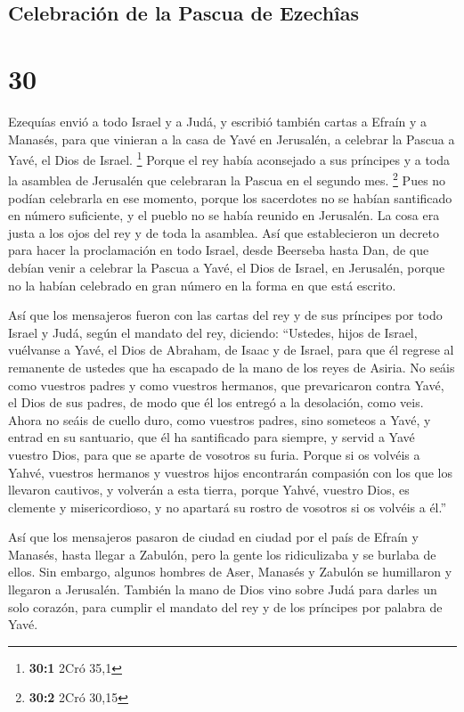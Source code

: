 \begin{paracol}{2}
{\subsection{Celebración de la Pascua de
Ezechîas}\label{celebraciuxf3n-de-la-pascua-de-ezechuxeeas}}

\hypertarget{section-58}{%
\section{30}\label{section-58}}

 Ezequías envió a todo Israel y a Judá, y escribió también
cartas a Efraín y a Manasés, para que vinieran a la casa de Yavé en
Jerusalén, a celebrar la Pascua a Yavé, el Dios de Israel. \footnote{\textbf{30:1}
  2Cró 35,1}  Porque el rey había aconsejado a sus
príncipes y a toda la asamblea de Jerusalén que celebraran la Pascua en
el segundo mes. \footnote{\textbf{30:2} 2Cró 30,15}  Pues
no podían celebrarla en ese momento, porque los sacerdotes no se habían
santificado en número suficiente, y el pueblo no se había reunido en
Jerusalén.  La cosa era justa a los ojos del rey y de toda
la asamblea.  Así que establecieron un decreto para hacer
la proclamación en todo Israel, desde Beerseba hasta Dan, de que debían
venir a celebrar la Pascua a Yavé, el Dios de Israel, en Jerusalén,
porque no la habían celebrado en gran número en la forma en que está
escrito.

 Así que los mensajeros fueron con las cartas del rey y de
sus príncipes por todo Israel y Judá, según el mandato del rey,
diciendo: ``Ustedes, hijos de Israel, vuélvanse a Yavé, el Dios de
Abraham, de Isaac y de Israel, para que él regrese al remanente de
ustedes que ha escapado de la mano de los reyes de Asiria.
 No seáis como vuestros padres y como vuestros hermanos,
que prevaricaron contra Yavé, el Dios de sus padres, de modo que él los
entregó a la desolación, como veis.  Ahora no seáis de
cuello duro, como vuestros padres, sino someteos a Yavé, y entrad en su
santuario, que él ha santificado para siempre, y servid a Yavé vuestro
Dios, para que se aparte de vosotros su furia.  Porque si
os volvéis a Yahvé, vuestros hermanos y vuestros hijos encontrarán
compasión con los que los llevaron cautivos, y volverán a esta tierra,
porque Yahvé, vuestro Dios, es clemente y misericordioso, y no apartará
su rostro de vosotros si os volvéis a él.''

 Así que los mensajeros pasaron de ciudad en ciudad por
el país de Efraín y Manasés, hasta llegar a Zabulón, pero la gente los
ridiculizaba y se burlaba de ellos.  Sin embargo, algunos
hombres de Aser, Manasés y Zabulón se humillaron y llegaron a Jerusalén.
 También la mano de Dios vino sobre Judá para darles un
solo corazón, para cumplir el mandato del rey y de los príncipes por
palabra de Yavé.


\end{paracol}
